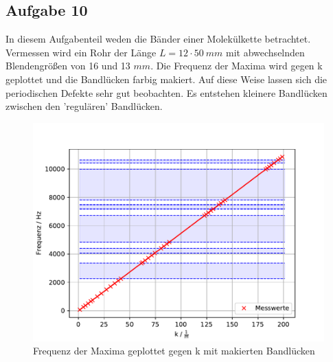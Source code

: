 \subsection{Aufgabe 10}
In diesem Aufgabenteil weden die Bänder einer Molekülkette betrachtet.
Vermessen wird ein Rohr der Länge $L=12 \cdot \SI{50}{mm}$ mit abwechselnden Blendengrößen von 16 und 13 $\si{mm}$.
Die Frequenz der Maxima wird gegen k geplottet und die Bandlücken farbig makiert.
Auf diese Weise lassen sich die periodischen Defekte sehr gut beobachten.
Es entstehen kleinere Bandlücken zwischen den 'regulären' Bandlücken.
\begin{figure}[h!]
  \centering
  \includegraphics[width=1\textwidth]{A101.pdf}
  \caption{Frequenz der Maxima geplottet gegen k mit makierten Bandlücken}
  \label{fig.Aufgabe101}
\end{figure}
  \FloatBarrier


